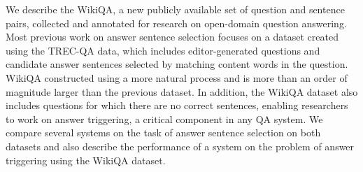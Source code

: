 We describe the WikiQA, a new publicly available set of question and sentence pairs, collected and annotated for research on open-domain question answering. Most previous work on answer sentence selection focuses on a dataset created using the TREC-QA data, which includes editor-generated questions and candidate answer sentences selected by matching content words in the question. WikiQA constructed using a more natural process and is more than an order of magnitude larger than the previous dataset. In addition, the WikiQA dataset also includes questions for which there are no correct sentences, enabling researchers to work on answer triggering, a critical component in any QA system. We compare several systems on the task of answer sentence selection on both datasets and also describe the performance of a system on the problem of answer triggering using the WikiQA dataset.
